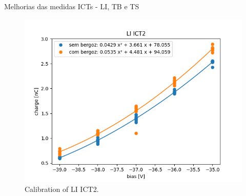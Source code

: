 \begin{frame}{Melhorias das medidas ICTs - LI, TB e TS}
\begin{figure}[ht]
\begin{minipage}[b]{0.4\linewidth}
        \centering
        \includegraphics[width=\textwidth]{2024-07-12/figures/li-ict2.png}
        \caption{Calibration of LI ICT2.}
        \label{fig:b}
    \end{minipage}
\end{figure}
\end{frame}




